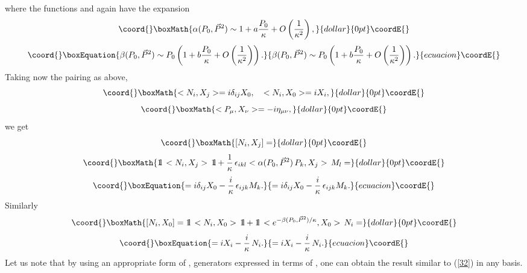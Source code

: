 \documentclass [prd,twocolumn,nofootinbib,showpacs]  {revtex4}
\def\bbbone{{\mathchoice {\rm 1\mskip-4mu l} {\rm 1\mskip-4mu l}
{\rm 1\mskip-4.5mu l} {\rm 1\mskip-5mu l}}}
\begin{document}
where the functions \myHighlight{$\alpha$}\coordHE{} and \myHighlight{$\beta$}\coordHE{} again have the expansion
$$\coord{}\boxMath{
 \alpha({ P}_0, \vec{{    P}}{}^2) \sim 1 + a \frac{{ P}_0}{\kappa} + O\left(\frac{1}{\kappa^2}\right),
}{dollar}{0pt}\coordE{}$$
\begin{equation}\coord{}\boxEquation{\label{33}
\beta({ P}_0, \vec{{    P}}{}^2) \sim { P}_0\left(1 + b \frac{{ P}_0}{\kappa} +
O\left(\frac{1}{\kappa^2}\right)\right).
}{\beta({ P}_0, \vec{{    P}}{}^2) \sim { P}_0\left(1 + b \frac{{ P}_0}{\kappa} +
O\left(\frac{1}{\kappa^2}\right)\right).
}{ecuacion}\coordE{}\end{equation}
Taking now the pairing as above,
$$\coord{}\boxMath{
<N_i, X_j> = i \delta_{ij} X_0, \quad <N_i, X_0> = i  X_i, }{dollar}{0pt}\coordE{}$$  $$\coord{}\boxMath{ <P_\mu, X_\nu> = -i \eta_{\mu\nu},
}{dollar}{0pt}\coordE{}$$
we get
$$\coord{}\boxMath{
[N_i, X_j] =}{dollar}{0pt}\coordE{}$$  $$\coord{}\boxMath{ \bbbone\, < N_i, X_j >\, \bbbone +
\frac1\kappa\, \epsilon_{ikl} <\alpha({ P}_0, \vec{{    P}}{}^2)\, P_k, X_j >\, M_l =
}{dollar}{0pt}\coordE{}$$
\begin{equation}\coord{}\boxEquation{\label{34}
 = i \delta_{ij} X_0 - \frac{i}\kappa\, \epsilon_{ijk} M_k.
}{= i \delta_{ij} X_0 - \frac{i}\kappa\, \epsilon_{ijk} M_k.
}{ecuacion}\coordE{}\end{equation}
Similarly
$$\coord{}\boxMath{
[N_i, X_0] = \bbbone\, < N_i, X_0 >\, \bbbone +
\bbbone\, <e^{-\beta({ P}_0, \vec{{    P}}{}^2)/\kappa}, X_0 >\, N_i =
}{dollar}{0pt}\coordE{}$$
\begin{equation}\coord{}\boxEquation{\label{35}
 = i  X_i - \frac{i}\kappa\,  N_i.
}{= i  X_i - \frac{i}\kappa\,  N_i.
}{ecuacion}\coordE{}\end{equation}
Let us note that by using an appropriate form of \coordHE{}, \coordHE{}
generators expressed in terms of \coordHE{},  \coordHE{} one can obtain
the result similar to (\ref{32}) in any basis.
\end{document}
